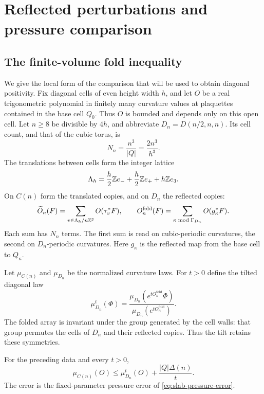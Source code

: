 \section{Reflected perturbations and pressure comparison}\label{sec:diagonal-positivity}

\subsection{The finite-volume fold inequality}\label{subsec:slab-finite-fold}

We give the local form of the comparison that will be used to obtain
diagonal positivity. Fix diagonal cells of even height width $h$,
and let $O$ be a real trigonometric polynomial in finitely many
curvature values at plaquettes contained in the base cell $Q_0$.
Thus $O$ is bounded and depends only on this open cell. Let $n\ge8$
be divisible by $4h$, and abbreviate $D_n=D(n/2,n,n)$. Its cell
count, and that of the cubic torus, is
\[
 N_n=\frac{n^3}{|Q|}=\frac{2n^3}{h^3}.
\]
The translations between cells form the integer lattice
\[
 \Lambda_h=\frac h2\mathbb Z e_-+\frac h2\mathbb Z e_++h\mathbb Z e_3.
\]
On $C(n)$ form the translated copies, and on $D_n$ the reflected
copies:
\begin{equation}\label{eq:slab-two-arrays}
 \widetilde O_n(F)=\sum_{v\in\Lambda_h/n\mathbb Z^3}O(\tau_v^*F),
 \qquad O_n^{\mathrm{fold}}(F)=\sum_{\kappa\bmod\Gamma_{D_n}}
                                                O(g_\kappa^*F).
\end{equation}
Each sum has $N_n$ terms. The first sum is read on cubic-periodic
curvatures, the second on $D_n$-periodic curvatures. Here $g_\kappa$
is the reflected map from the base cell to $Q_\kappa$.

Let $\mu_{C(n)}$ and $\mu_{D_n}$ be the normalized curvature laws.
For $t>0$ define the tilted diagonal law
\begin{equation}\label{eq:slab-tilted-law}
 \mu_{D_n}^t(\Phi)=
 \frac{\mu_{D_n}(e^{tO_n^{\mathrm{fold}}}\Phi)}
      {\mu_{D_n}(e^{tO_n^{\mathrm{fold}}})}.
\end{equation}
The folded array is invariant under the group generated by the cell
walls: that group permutes the cells of $D_n$ and their reflected
copies. Thus the tilt retains these symmetries.

\begin{proposition}\label{prop:slab-finite-fold}
For the preceding data and every $t>0$,
\begin{equation}\label{eq:slab-finite-fold}
 \mu_{C(n)}(O)\le\mu_{D_n}^t(O)+\frac{|Q|\Delta(n)}{t}.
\end{equation}
The error is the fixed-parameter pressure error of
\eqref{eq:slab-pressure-error}.
\end{proposition}

